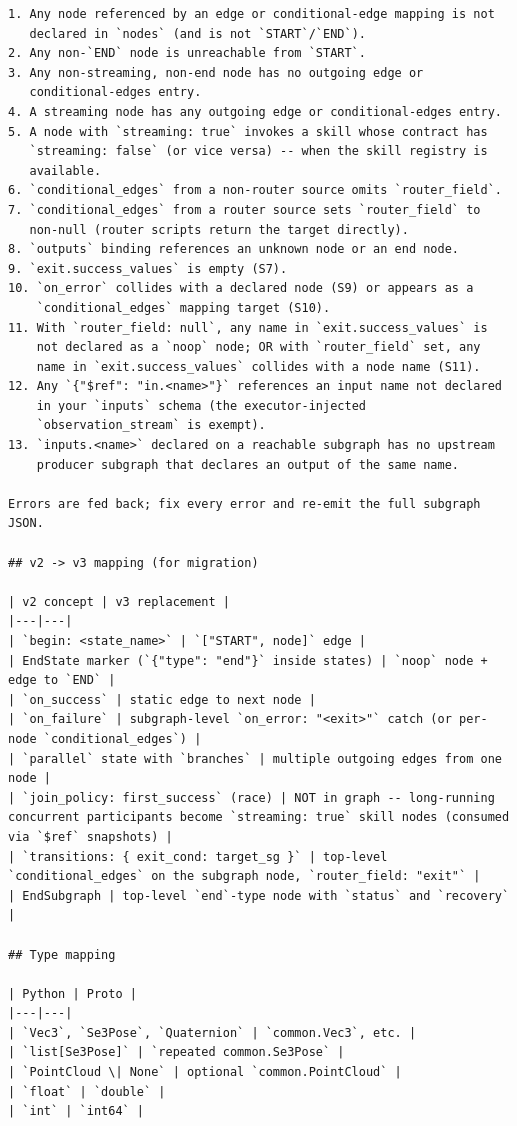 \begin{lstlisting}
1. Any node referenced by an edge or conditional-edge mapping is not
   declared in `nodes` (and is not `START`/`END`).
2. Any non-`END` node is unreachable from `START`.
3. Any non-streaming, non-end node has no outgoing edge or
   conditional-edges entry.
4. A streaming node has any outgoing edge or conditional-edges entry.
5. A node with `streaming: true` invokes a skill whose contract has
   `streaming: false` (or vice versa) -- when the skill registry is
   available.
6. `conditional_edges` from a non-router source omits `router_field`.
7. `conditional_edges` from a router source sets `router_field` to
   non-null (router scripts return the target directly).
8. `outputs` binding references an unknown node or an end node.
9. `exit.success_values` is empty (S7).
10. `on_error` collides with a declared node (S9) or appears as a
    `conditional_edges` mapping target (S10).
11. With `router_field: null`, any name in `exit.success_values` is
    not declared as a `noop` node; OR with `router_field` set, any
    name in `exit.success_values` collides with a node name (S11).
12. Any `{"$ref": "in.<name>"}` references an input name not declared
    in your `inputs` schema (the executor-injected
    `observation_stream` is exempt).
13. `inputs.<name>` declared on a reachable subgraph has no upstream
    producer subgraph that declares an output of the same name.

Errors are fed back; fix every error and re-emit the full subgraph JSON.

## v2 -> v3 mapping (for migration)

| v2 concept | v3 replacement |
|---|---|
| `begin: <state_name>` | `["START", node]` edge |
| EndState marker (`{"type": "end"}` inside states) | `noop` node + edge to `END` |
| `on_success` | static edge to next node |
| `on_failure` | subgraph-level `on_error: "<exit>"` catch (or per-node `conditional_edges`) |
| `parallel` state with `branches` | multiple outgoing edges from one node |
| `join_policy: first_success` (race) | NOT in graph -- long-running concurrent participants become `streaming: true` skill nodes (consumed via `$ref` snapshots) |
| `transitions: { exit_cond: target_sg }` | top-level `conditional_edges` on the subgraph node, `router_field: "exit"` |
| EndSubgraph | top-level `end`-type node with `status` and `recovery` |

## Type mapping

| Python | Proto |
|---|---|
| `Vec3`, `Se3Pose`, `Quaternion` | `common.Vec3`, etc. |
| `list[Se3Pose]` | `repeated common.Se3Pose` |
| `PointCloud \| None` | optional `common.PointCloud` |
| `float` | `double` |
| `int` | `int64` |


\end{lstlisting}
